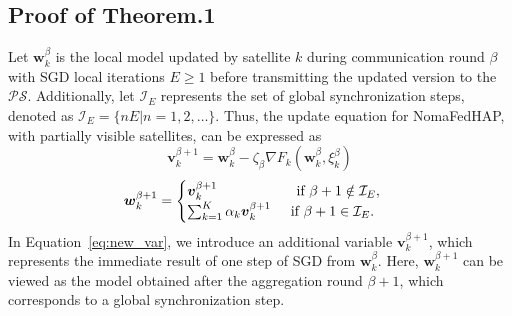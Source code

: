 \documentclass[letter,journal]{IEEEtran}
\begin{document}
\begin{appendices}
\section{Proof of Theorem.1}
Let $\boldsymbol{w}_{k}^\beta$ is the local model updated by satellite $k$ during communication round $\beta$ with SGD local iterations $E\geq1$ before transmitting the updated version to the $\mathcal{PS}$. Additionally, let $\mathcal{I}_{E}$ represents the set of global synchronization steps, denoted as $\mathcal{I}_{E}= \{nE|n = 1, 2, \dots\}$. Thus, the update equation for NomaFedHAP, with partially visible satellites, can be expressed as
\begin{equation}\label{eq:new_var}
    \boldsymbol{v}_{k}^{\beta+1} = \boldsymbol{w}_{k}^{\beta}- \zeta_{{\beta}} \nabla F_{k}(\boldsymbol{w}_{k}^{\beta},\xi_{k}^{\beta})
\end{equation}
\begin{equation}
\boldsymbol{w}_{k}^{\beta+1}=
\begin{cases}
        \boldsymbol{v}_{k}^{\beta+1} \hspace{2cm}\text{if}~\beta+1 \notin \mathcal{I}_{E},\\ \sum_{k=1}^{K}\alpha_{k}  \boldsymbol{v}_{k}^{\beta+1} \hspace{0.5cm}\text{if}~\beta+1 \in \mathcal{I}_{E}.
\end{cases}
\end{equation}
In Equation~\eqref{eq:new_var}, we introduce an additional variable $\boldsymbol{v}_{k}^{\beta+1}$, which represents the immediate result of one step of SGD from $\boldsymbol{w}_{k}^{\beta}$. Here, $\boldsymbol{w}_{k}^{\beta+1}$ can be viewed as the model obtained after the aggregation round $\beta+1$, which corresponds to a global synchronization step.


\end{appendices}
\end{document}
